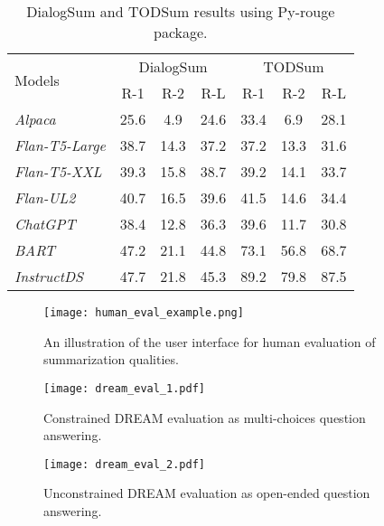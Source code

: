 \documentclass[11pt]{article}
\begin{document}
\begin{table*}[t]
        \centering
        \begin{adjustbox}{width=0.75\textwidth,center}
        \begin{tabular}{ | l | c  c  c | c  c  c | }
        \toprule
        \multirow{2}{*}{Models} & \multicolumn{3}{c|}{DialogSum} & \multicolumn{3}{c|}{TODSum}\\ \cline{2-7}
         & R-1 & R-2 & R-L & R-1 & R-2 & R-L \\
        \hline
        \emph{Alpaca} & 25.6 & 4.9 & 24.6 & 33.4 & 6.9 & 28.1 \\
        \emph{Flan-T5-Large} & 38.7 & 14.3 & 37.2 & 37.2 & 13.3 & 31.6 \\
        \emph{Flan-T5-XXL} & 39.3 & 15.8 & 38.7 & 39.2 & 14.1 & 33.7 \\
        \emph{Flan-UL2} & 40.7 & 16.5 & 39.6 & 41.5 & 14.6 & 34.4 \\
        \emph{ChatGPT} & 38.4 & 12.8 & 36.3 & 39.6 & 11.7 & 30.8 \\
        \emph{BART} & 47.2 & 21.1 & 44.8 & 73.1 & 56.8 & 68.7 \\
        \hline
        \emph{InstructDS} & 47.7 & 21.8 & 45.3 & 89.2 & 79.8 & 87.5 \\ 
        \bottomrule
        \end{tabular}
        \end{adjustbox}
        \caption{DialogSum and TODSum results using Py-rouge package.}
        \label{tab:appendix_dialogsum_todsum}
    \end{table*}



\begin{figure*}[htb]
            \centering
            \texttt{[image: human\_eval\_example.png]}
            \caption{An illustration of the user interface for human evaluation of summarization qualities.}
            \label{fig:human_eval_examples}
        \end{figure*}



\begin{figure*}[tb]
        \centering
        \texttt{[image: dream\_eval\_1.pdf]}
        \caption{Constrained DREAM evaluation as multi-choices question answering.}
        \label{fig:dream_eval1}
    \end{figure*}



\begin{figure*}[tb]
        \centering
        \texttt{[image: dream\_eval\_2.pdf]}
        \caption{Unconstrained DREAM evaluation as open-ended question answering.}
        \label{fig:dream_eval2}
    \end{figure*}
\end{document}
